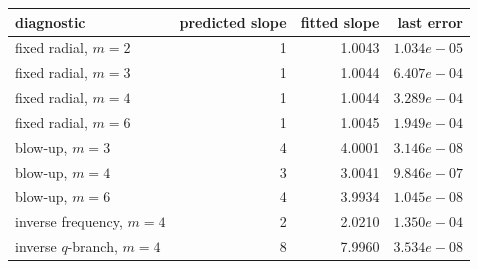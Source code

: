 \begin{tabular}{@{}lrrr@{}}
\toprule
diagnostic & predicted slope & fitted slope & last error\\
\midrule
fixed radial, $m=2$ & 1 & 1.0043 & $1.034e-05$\\
fixed radial, $m=3$ & 1 & 1.0044 & $6.407e-04$\\
fixed radial, $m=4$ & 1 & 1.0044 & $3.289e-04$\\
fixed radial, $m=6$ & 1 & 1.0045 & $1.949e-04$\\
blow-up, $m=3$ & 4 & 4.0001 & $3.146e-08$\\
blow-up, $m=4$ & 3 & 3.0041 & $9.846e-07$\\
blow-up, $m=6$ & 4 & 3.9934 & $1.045e-08$\\
inverse frequency, $m=4$ & 2 & 2.0210 & $1.350e-04$\\
inverse $q$-branch, $m=4$ & 8 & 7.9960 & $3.534e-08$\\
\bottomrule
\end{tabular}
